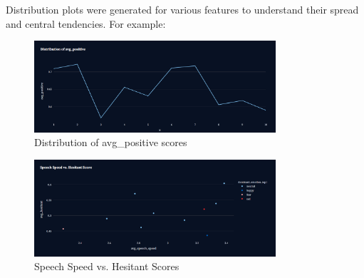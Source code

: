 \documentclass{article}
\begin{document}
\newpage

Distribution plots were generated for various features to understand their spread and central tendencies. For example:

\begin{figure}[H]
    \centering
    \includegraphics[width=0.8\textwidth]{images/avg_positve_distribution.png}
    \caption{Distribution of avg\_positive scores}
    \label{fig:avg_positive_distribution}
\end{figure}


\begin{figure}[H]
    \centering
    \includegraphics[width=0.8\textwidth]{images/speech_speed_vs_hesitant.png}
    \caption{Speech Speed vs. Hesitant Scores}
    \label{fig:speech_speed_vs_hesitant}
\end{figure}
\end{document}
